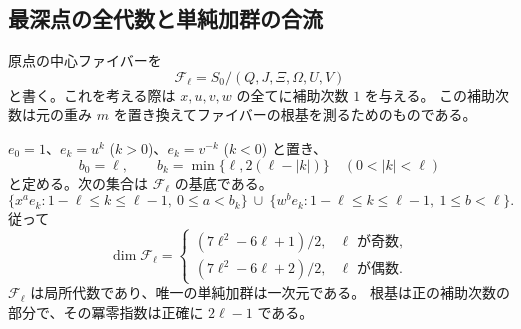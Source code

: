 \subsection{最深点の全代数と単純加群の合流}

原点の中心ファイバーを
\[
 \mathcal F_\ell=S_0/(Q,J,\Xi,\Omega,U,V)
\]
と書く。これを考える際は $x,u,v,w$ の全てに補助次数 $1$ を与える。
この補助次数は元の重み $m$ を置き換えてファイバーの根基を測るためのものである。

\begin{theorem}[最深点の基底と根基]\label{thm:deepest-fiber-v40}
$e_0=1$、$e_k=u^k$ ($k>0$)、$e_k=v^{-k}$ ($k<0$) と置き、
\[
 b_0=\ell,\qquad b_k=\min\{\ell,2(\ell-|k|)\}\quad(0<|k|<\ell)
\]
と定める。次の集合は $\mathcal F_\ell$ の基底である。
\begin{equation}\label{eq:deepest-basis-v40}
 \{x^ae_k:1-\ell\le k\le\ell-1,\ 0\le a<b_k\}
 \ \cup\
 \{w^be_k:1-\ell\le k\le\ell-1,\ 1\le b<\ell\}.
\end{equation}
従って
\begin{equation}\label{eq:deepest-dimension-v40}
 \dim\mathcal F_\ell=
 \begin{cases}
 (7\ell^2-6\ell+1)/2,&\ell\text{ が奇数},\\
 (7\ell^2-6\ell+2)/2,&\ell\text{ が偶数}.
 \end{cases}
\end{equation}
$\mathcal F_\ell$ は局所代数であり、唯一の単純加群は一次元である。
根基は正の補助次数の部分で、その冪零指数は正確に $2\ell-1$ である。
\end{theorem}

